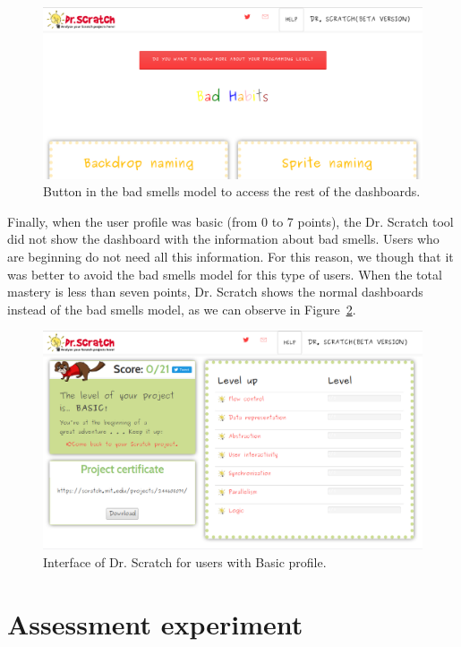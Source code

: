 \begin{figure}
    \centering
    \includegraphics[width=12cm,                         keepaspectratio]{img/button.png}
    \caption{Button in the bad smells model to access the rest of the dashboards.}
    \label{fig:button}
\end{figure}


Finally, when the user profile was basic (from 0 to 7 points), the Dr. Scratch tool did not show the dashboard with the information about bad smells. Users who are beginning do not need all this information. For this reason, we though that it was better to avoid the bad smells model for this type of users. When the total mastery is less than seven points, Dr. Scratch shows the normal dashboards instead of the bad smells model, as we can observe in Figure~\ref{fig:basic_level}.

\begin{figure}
    \centering
    \includegraphics[width=12cm,                         keepaspectratio]{img/basic_level.png}
    \caption{Interface of Dr. Scratch for users with Basic profile.}
    \label{fig:basic_level}
\end{figure}


\section{Assessment experiment}
\label{sec:experiment}

